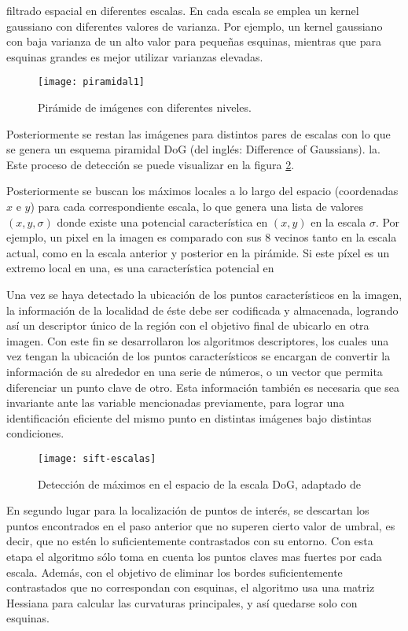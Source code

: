 filtrado espacial en diferentes escalas. En cada escala se emplea un kernel  gaussiano con diferentes valores de varianza. Por ejemplo, un kernel gaussiano con baja varianza de un alto valor para pequeñas esquinas, mientras que para esquinas grandes es mejor utilizar varianzas elevadas. 


\begin{figure}[H]
	\centering
	\texttt{[image: piramidal1]}
	\caption{Pirámide de imágenes con diferentes niveles.}
	\label{imagen:piramidal}
\end{figure}

Posteriormente se restan las imágenes para distintos pares de escalas con lo que se genera un esquema piramidal DoG (del inglés: Difference of Gaussians). la. Este proceso de detección se puede visualizar en la figura \ref{imagen:sift-escalas}.

Posteriormente se buscan los máximos locales a lo largo del espacio (coordenadas $x$ e $y$) para cada correspondiente escala, lo que genera una lista de valores $(x, y, \sigma)$ donde existe una potencial característica en $(x, y)$ en la escala $\sigma$. Por ejemplo, un pixel en la imagen es comparado con sus 8 vecinos tanto en la escala actual, como en la escala anterior y posterior en la pirámide. Si este píxel es un extremo local en una, es una característica potencial en 


Una vez se haya detectado la ubicación de los puntos característicos en la imagen, la información de la localidad de éste debe ser codificada y almacenada, logrando así un descriptor único de la región con el objetivo final de ubicarlo en otra imagen. Con este fin se desarrollaron los algoritmos descriptores, los cuales una vez tengan la ubicación de los puntos característicos se encargan de convertir la información de su alrededor en una serie de números, o un vector que permita diferenciar un punto clave de otro. Esta información también es necesaria que sea invariante ante las variable mencionadas previamente, para lograr una identificación eficiente del mismo punto en distintas imágenes bajo distintas condiciones.



\begin{figure}[H]
	\centering
	\texttt{[image: sift-escalas]}
	\caption[Detector SIFT]{Detección de máximos en el espacio de la escala DoG, adaptado de \cite{sift}}
	\label{imagen:sift-escalas}
\end{figure}

En segundo lugar para la localización de puntos de interés, se descartan los puntos encontrados en el paso anterior que no superen cierto valor de umbral, es decir, que no estén lo suficientemente contrastados con su entorno. Con esta etapa el algoritmo sólo toma en cuenta los puntos claves mas fuertes por cada escala. Además, con el objetivo de eliminar los bordes suficientemente contrastados que no correspondan con esquinas, el algoritmo usa una matriz Hessiana para calcular las curvaturas principales, y así quedarse solo con esquinas.

